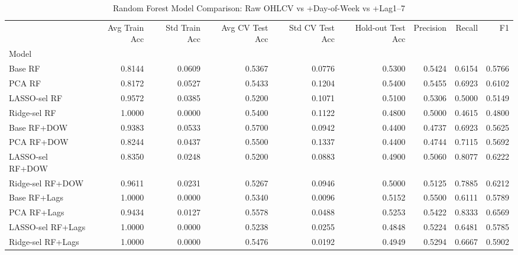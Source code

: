 \begin{table}
\caption{Random Forest Model Comparison: Raw OHLCV vs +Day-of-Week vs +Lag1--7}
\label{tab:base_rf_comparison}
\begin{tabular}{lrrrrrrrr}
\toprule
 & Avg Train Acc & Std Train Acc & Avg CV Test Acc & Std CV Test Acc & Hold-out Test Acc & Precision & Recall & F1 \\
Model &  &  &  &  &  &  &  &  \\
\midrule
Base RF & 0.8144 & 0.0609 & 0.5367 & 0.0776 & 0.5300 & 0.5424 & 0.6154 & 0.5766 \\
PCA RF & 0.8172 & 0.0527 & 0.5433 & 0.1204 & 0.5400 & 0.5455 & 0.6923 & 0.6102 \\
LASSO-sel RF & 0.9572 & 0.0385 & 0.5200 & 0.1071 & 0.5100 & 0.5306 & 0.5000 & 0.5149 \\
Ridge-sel RF & 1.0000 & 0.0000 & 0.5400 & 0.1122 & 0.4800 & 0.5000 & 0.4615 & 0.4800 \\
Base RF+DOW & 0.9383 & 0.0533 & 0.5700 & 0.0942 & 0.4400 & 0.4737 & 0.6923 & 0.5625 \\
PCA RF+DOW & 0.8244 & 0.0437 & 0.5500 & 0.1337 & 0.4400 & 0.4744 & 0.7115 & 0.5692 \\
LASSO-sel RF+DOW & 0.8350 & 0.0248 & 0.5200 & 0.0883 & 0.4900 & 0.5060 & 0.8077 & 0.6222 \\
Ridge-sel RF+DOW & 0.9611 & 0.0231 & 0.5267 & 0.0946 & 0.5000 & 0.5125 & 0.7885 & 0.6212 \\
Base RF+Lags & 1.0000 & 0.0000 & 0.5340 & 0.0096 & 0.5152 & 0.5500 & 0.6111 & 0.5789 \\
PCA RF+Lags & 0.9434 & 0.0127 & 0.5578 & 0.0488 & 0.5253 & 0.5422 & 0.8333 & 0.6569 \\
LASSO-sel RF+Lags & 1.0000 & 0.0000 & 0.5238 & 0.0255 & 0.4848 & 0.5224 & 0.6481 & 0.5785 \\
Ridge-sel RF+Lags & 1.0000 & 0.0000 & 0.5476 & 0.0192 & 0.4949 & 0.5294 & 0.6667 & 0.5902 \\
\bottomrule
\end{tabular}
\end{table}

